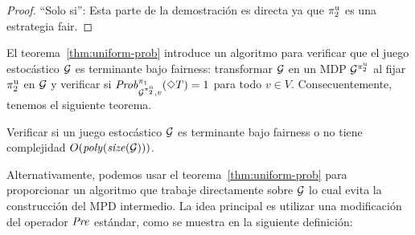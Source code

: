 \begin{proof}
\noindent ``Solo si'': Esta parte de la demostración es directa ya que $\pi^{\mathrm{u}}_{2}$ es una estrategia fair.
\qedhere
\end{proof} 

El teorema~\ref{thm:uniform-prob} introduce un algoritmo para verificar que el juego estocástico $\mathcal{G}$ es terminante bajo fairness: transformar
$\mathcal{G}$ en un MDP $\mathcal{G}^{\pi^{\mathrm{u}}_{2}}$ al fijar
$\pi^{\mathrm{u}}_{2}$ en $\mathcal{G}$ y verificar si
$\mathit{Prob}^{\pi_{1}}_{\mathcal{G}^{\pi^{\mathrm{u}}_{2}},v}(\Diamond T)=1$ para todo $v\in V$.
%
Consecuentemente, tenemos el siguiente teorema.

\begin{theorem}\label{thm:fair-is-poly}
  Verificar si un juego estocástico $\mathcal{G}$ es terminante bajo
  fairness o no tiene complejidad $O(\mathit{poly}(\mathit{size}(\mathcal{G})))$.
\end{theorem}


Alternativamente, podemos usar el teorema~\ref{thm:uniform-prob} para proporcionar un
algoritmo que trabaje directamente sobre $\mathcal{G}$ lo cual evita la construcción del
MPD intermedio.
%
La idea principal es utilizar una modificación del operador $\mathit{Pre}$
estándar, como se muestra en la siguiente definición:

